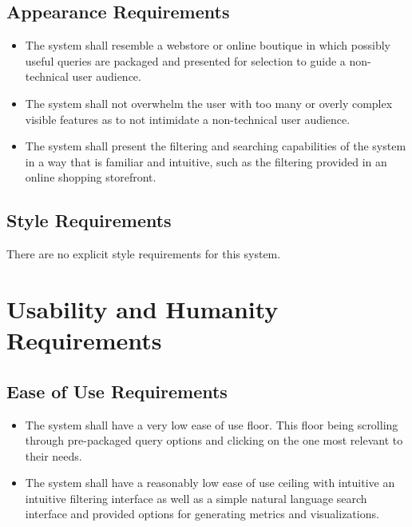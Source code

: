 \documentclass[12pt]{article}
\begin{document}
\subsection{Appearance Requirements}

\begin{itemize}
    \item The system shall resemble a webstore or online boutique in which possibly useful queries are packaged and presented for selection to guide 
    a non-technical user audience.
    \item The system shall not overwhelm the user with too many or overly complex visible features as to not intimidate a non-technical user audience.
    \item The system shall present the filtering and searching capabilities of the system in a way that is familiar and intuitive, such as the 
    filtering provided in an online shopping storefront.
\end{itemize}

\subsection{Style Requirements}

\par{There are no explicit style requirements for this system.}

\section{Usability and Humanity Requirements}



\subsection{Ease of Use Requirements}

\begin{itemize}
    \item The system shall have a very low ease of use floor. This floor being scrolling through
    pre-packaged query options and clicking on the one most relevant to their needs.
    \item The system shall have a reasonably low ease of use ceiling with intuitive an intuitive filtering interface
    as well as a simple natural language search interface and provided options for generating metrics and visualizations.
\end{itemize}
\end{document}
